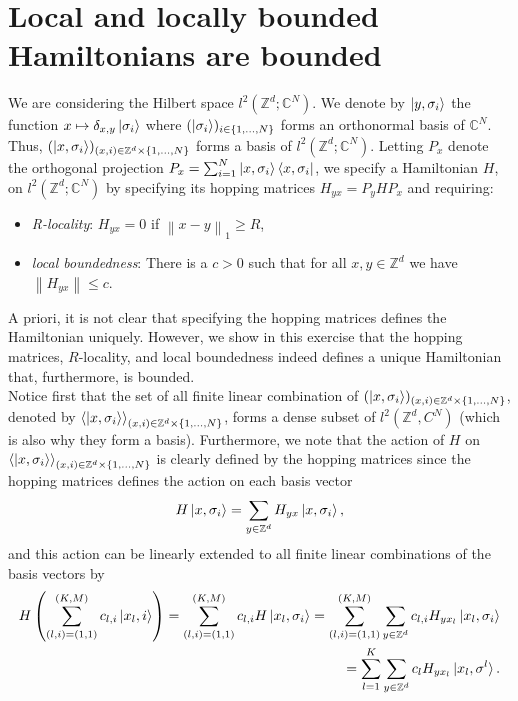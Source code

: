 \documentclass[a4paper,11pt]{article}
\newcommand{\norm}[1]{\left\lVert #1 \right\rVert}
\newcommand{\C}{\mathbb{C}}
\newcommand{\Z}{\mathbb{Z}}
\numberwithin{equation}{section}
\begin{document}
 	\section{Local and locally bounded Hamiltonians are bounded}
 	We are considering the Hilbert space $ l^2(\Z^d;\C^N) $. We denote by $ \ket{y,\sigma_i} $ the function $ x\mapsto\delta_{x,y}\ket{\sigma_i} $ where $ (\ket{\sigma_i})_{i\in\{1,...,N\}} $ forms an orthonormal basis of $ \C^N $. Thus, $ (\ket{x,\sigma_i})_{(x,i)\in\Z^d\times\{1,...,N\}} $ forms a basis of $ l^2(\Z^d;\C^N) $. Letting $ P_x $ denote the orthogonal projection $ P_x=\sum_{i=1}^{N}\ket{x,\sigma_i}\bra{x,\sigma_i} $, we specify a Hamiltonian $ H $, on $ l^2(\Z^d;\C^N) $ by specifying its hopping matrices $ H_{yx}=P_yHP_x $ and requiring:
 	\begin{itemize}
 		\item \emph{R-locality}: $ H_{yx}=0 $ if $ \norm{x-y}_1\geq R $,
 		\item \emph{local boundedness}: There is a $ c>0 $ such that for all $ x,y\in\Z^d $ we have $ \norm{H_{yx}}\leq c $.
 	\end{itemize}
 	 A priori, it is not clear that specifying the hopping matrices defines the Hamiltonian uniquely. However, we show in this exercise that the hopping matrices, $ R $-locality, and local boundedness indeed defines a unique Hamiltonian that, furthermore, is bounded.\\
 	 Notice first that the set of all finite linear combination of $ (\ket{x,\sigma_i})_{(x,i)\in\Z^d\times\{1,...,N\}} $, denoted by $ \braket{\ket{x,\sigma_i}}_{(x,i)\in\Z^d\times\{1,...,N\}} $, forms a dense subset of $ l^2(\Z^d,C^N) $ (which is also why they form a basis). Furthermore, we note that the action of $ H $ on $ \braket{\ket{x,\sigma_i}}_{(x,i)\in\Z^d\times\{1,...,N\}} $ is clearly defined by the hopping matrices since the hopping matrices defines the action on each basis vector \begin{equation}
 	 H\ket{x,\sigma_i}=\sum_{y\in\Z^d}H_{yx}\ket{x,\sigma_i}, \label{actionH1}
 	 \end{equation}
 	 and this action can be linearly extended to all finite linear combinations of the basis vectors by \begin{equation}\begin{aligned}
 	 H\left(\sum_{(l,i)=(1,1)}^{(K,M)}c_{l,i}\ket{x_l,i}\right)=\sum_{(l,i)=(1,1)}^{(K,M)}c_{l,i}H\ket{x_l,\sigma_i}=\sum_{(l,i)=(1,1)}^{(K,M)}\sum_{y\in\Z^d}c_{l,i}H_{yx_l}\ket{x_l,\sigma_i}\\
 	 =\sum_{l=1}^{K}\sum_{y\in\Z^d}c_{l}H_{yx_l}\ket{x_l,\sigma^l}. 
 	 \end{aligned}
 	 \label{actionH2}
 	 \end{equation}
\end{document}

